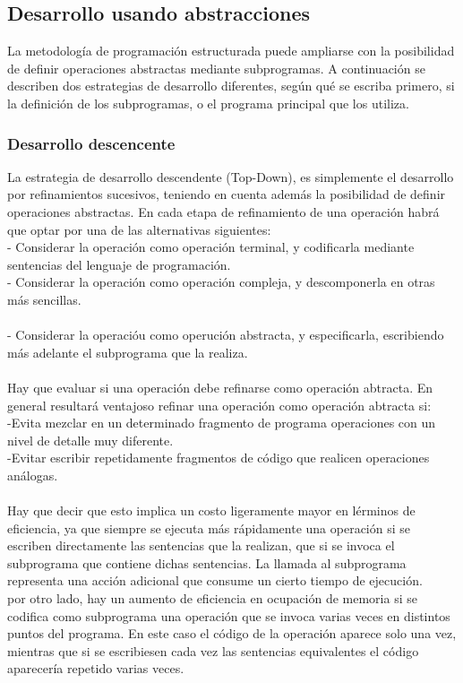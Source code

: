 \documentclass[11pt,a4paper]{article}
\begin{document}
  \subsection{Desarrollo usando abstracciones}
  La metodología de programación estructurada puede ampliarse con la posibilidad de definir operaciones abstractas mediante subprogramas. A continuación se describen dos estrategias de desarrollo diferentes, según qué se escriba primero, si la definición de los subprogramas, o el programa principal que los
  utiliza. \\
  \subsubsection{Desarrollo descencente}
  La estrategia de desarrollo descendente (Top-Down), es simplemente el desarrollo por refinamientos sucesivos, teniendo en cuenta además la posibilidad de definir operaciones abstractas. En cada etapa de refinamiento de una operación habrá que optar por una de las alternativas siguientes:\\
  - Considerar la operación como operación terminal, y codificarla mediante
  sentencias del lenguaje de programación. 
  \\
  -  Considerar la operación como operación compleja, y descomponerla en
  otras más sencillas.\\
  \\
  - Considerar la operacióu como operución abstracta, y especificarla, escribiendo más adelante el subprograma que la realiza. \\
  \\
  Hay que evaluar si una operación debe refinarse como operación abtracta. En general resultará ventajoso refinar una operación como operación abtracta si:
  \\
  -Evita mezclar  en un determinado fragmento de programa operaciones
  con un nivel de detalle muy diferente.\\
  -Evitar escribir repetidamente fragmentos de código que realicen operaciones análogas.\\
  \\
  Hay que decir que esto implica un costo ligeramente mayor en
  lérminos de eficiencia, ya que siempre se ejecuta más rápidamente una operación si se escriben directamente las sentencias que la realizan, que si se invoca
  el subprograma que contiene dichas sentencias. La llamada al subprograma
  representa una acción adicional que consume un cierto tiempo de ejecución. \\
  por otro lado, hay un aumento de eficiencia en ocupación de memoria si
  se codifica como subprograma una operación que se invoca varias veces en
  distintos puntos del programa. En este caso el código de la operación aparece
  solo una vez, mientras que si se escribiesen cada vez las sentencias equivalentes
  el código aparecería repetido varias veces.\\
\end{document}
